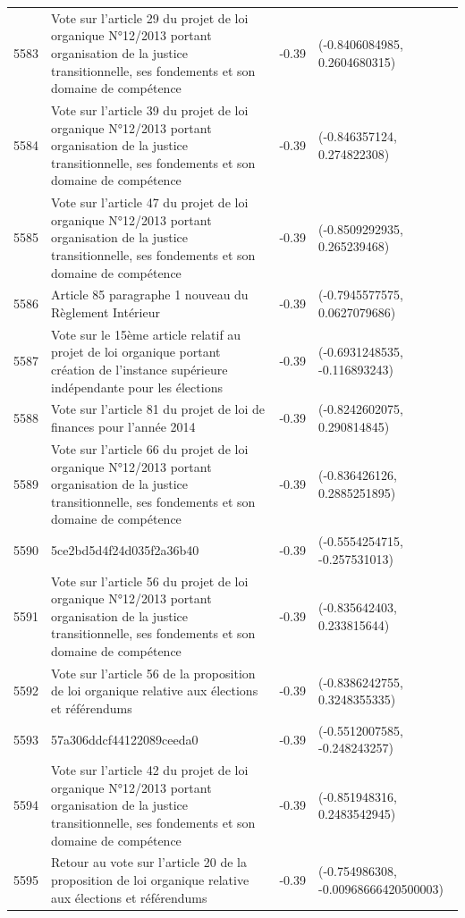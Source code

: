\begin{table}[ht]
\begin{tabular}{rlrl}
  5583 & Vote sur l'article 29 du projet de loi organique N°12/2013 portant organisation de la justice transitionnelle, ses fondements et son domaine de compétence & -0.39 & (-0.8406084985, 0.2604680315) \\ 
  5584 & Vote sur l'article 39 du projet de loi organique N°12/2013 portant organisation de la justice transitionnelle, ses fondements et son domaine de compétence & -0.39 & (-0.846357124, 0.274822308) \\ 
  5585 & Vote sur l'article 47 du projet de loi organique N°12/2013 portant organisation de la justice transitionnelle, ses fondements et son domaine de compétence & -0.39 & (-0.8509292935, 0.265239468) \\ 
  5586 & Article 85 paragraphe 1 nouveau du Règlement Intérieur & -0.39 & (-0.7945577575, 0.0627079686) \\ 
  5587 & Vote sur le 15ème article relatif au projet de loi organique portant création de l'instance supérieure indépendante pour les élections & -0.39 & (-0.6931248535, -0.116893243) \\ 
  5588 & Vote sur l'article 81 du projet de loi de finances pour l'année 2014 & -0.39 & (-0.8242602075, 0.290814845) \\ 
  5589 & Vote sur l'article 66 du projet de loi organique N°12/2013 portant organisation de la justice transitionnelle, ses fondements et son domaine de compétence & -0.39 & (-0.836426126, 0.2885251895) \\ 
  5590 & 5ce2bd5d4f24d035f2a36b40 & -0.39 & (-0.5554254715, -0.257531013) \\ 
  5591 & Vote sur l'article 56 du projet de loi organique N°12/2013 portant organisation de la justice transitionnelle, ses fondements et son domaine de compétence & -0.39 & (-0.835642403, 0.233815644) \\ 
  5592 & Vote sur l'article 56 de la proposition de loi organique relative aux élections et référendums & -0.39 & (-0.8386242755, 0.3248355335) \\ 
  5593 & 57a306ddcf44122089ceeda0 & -0.39 & (-0.5512007585, -0.248243257) \\ 
  5594 & Vote sur l'article 42 du projet de loi organique N°12/2013 portant organisation de la justice transitionnelle, ses fondements et son domaine de compétence & -0.39 & (-0.851948316, 0.2483542945) \\ 
  5595 & Retour au vote sur l'article 20 de la proposition de loi organique relative aux élections et référendums & -0.39 & (-0.754986308, -0.00968666420500003) \\ 

\end{tabular}
\end{table}
